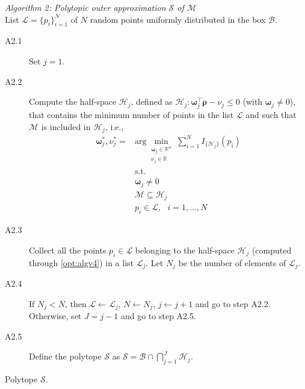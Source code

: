 \documentclass[twocolumn]{autart}
\newcommand{\tr}{\mbox{\tiny T}} %
\newcommand{\xhyp}{\mathbf{\rho}}
\begin{document}
\begin{algorithm} \emph{Algorithm 2: Polytopic outer approximation $\mathcal{S}$ of $\mathcal{M}$}  \\
  List $\mathcal{L}=\{p_i\}_{i=1}^N$ of $N$ random points uniformly distributed in the box $\mathcal{B}$.
\begin{description}
  \item[A2.1] Set $j=1$.
  \item[A2.2] Compute the half-space $\mathcal{H}_j$, defined as $\mathcal{H}_j:\boldsymbol{\omega}_j^\top \xhyp-\nu_j \leq 0$ (with $\boldsymbol{\omega}_j\neq 0$), that contains the minimum number of points in the list $\mathcal{L}$ and such that $\mathcal{M}$ is included in $\mathcal{H}_j$, i.e.,
  \begin{equation} \label{opt:algv4}
  \begin{split}
\boldsymbol{\omega}^*_j,\nu^*_j= & \mbox{arg} \min_{\substack{     \boldsymbol{\omega}_j \in \mathbb{R}^n\\ \nu_j \in \mathbb{R} }}
\sum_{i=1}^N I_{\{\mathcal{H}_j\}}(p_i) \\
   & \mbox{s.t. } \\
   & \boldsymbol{\omega}_j \neq 0 \\
   & \mathcal{M} \subseteq \mathcal{H}_j \\
   & p_i \in \mathcal{L}, \ \ \ i=1,\ldots,N
  \end{split}
  \end{equation}
\item[A2.3] Collect all the points $p_i \in \mathcal{L}$  belonging  to the half-space  $\mathcal{H}_j$ (computed through \eqref{opt:algv4}) in a list $\mathcal{L}_j$. Let $N_j$ be the number of elements of $\mathcal{L}_j$.
\item[A2.4] If $N_j < N$, then   $\mathcal{L} \leftarrow \mathcal{L}_j$, $N \leftarrow N_j$, $j \leftarrow j+1$ and go to step A2.2. Otherwise,  set $J=j-1$ and go to step  A2.5.
\item[A2.5] Define the polytope $\mathcal{S}$ as
$
\mathcal{S}=\mathcal{B} \cap \bigcap_{j=1}^J\mathcal{H}_j.
$
\end{description}
 Polytope $\mathcal{S}$.
\end{algorithm}
\end{document}
